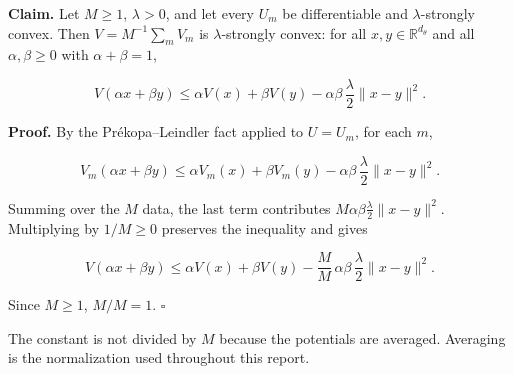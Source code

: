 \documentclass[11pt,a4paper]{report}
\begin{document}
\textbf{Claim.} Let \(M\ge1\), \(\lambda>0\), and let every \(U_m\) be differentiable and \(\lambda\)-strongly convex. Then \(V=M^{-1}\sum_mV_m\) is \(\lambda\)-strongly convex: for all \(x,y\in\mathbb R^{d_\theta}\) and all \(\alpha,\beta\ge0\) with \(\alpha+\beta=1\),


\[V(\alpha x+\beta y)\le\alpha V(x)+\beta V(y)-\alpha\beta\,\frac\lambda2\|x-y\|^2.\]


\textbf{Proof.} By the Prékopa–Leindler fact applied to \(U=U_m\), for each \(m\),


\[V_m(\alpha x+\beta y)\le\alpha V_m(x)+\beta V_m(y)-\alpha\beta\,\frac\lambda2\|x-y\|^2.\]


Summing over the \(M\) data, the last term contributes \(M\alpha\beta\frac\lambda2\|x-y\|^2\). Multiplying by \(1/M\ge0\) preserves the inequality and gives


\[V(\alpha x+\beta y)\le\alpha V(x)+\beta V(y)-\frac MM\,\alpha\beta\,\frac\lambda2\|x-y\|^2.\]


Since \(M\ge1\), \(M/M=1\). \(\square\)




The constant is not divided by \(M\) because the potentials are averaged. Averaging is the normalization used throughout this report.
\end{document}

